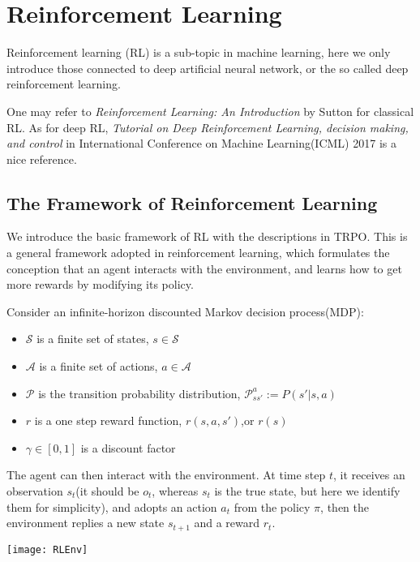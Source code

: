 \chapter{Reinforcement Learning}

Reinforcement learning (RL) is a sub-topic in machine learning, here we only introduce those connected to deep artificial neural network, or the so called deep reinforcement learning.

One may refer to \emph{Reinforcement Learning: An Introduction} by Sutton for classical RL. As for deep RL, \emph{Tutorial on Deep Reinforcement Learning, decision making, and control} in International Conference on Machine Learning(ICML) 2017 is a nice reference.

\section{The Framework of Reinforcement Learning}

We introduce the basic framework of RL with the descriptions in TRPO. This is a general framework adopted in reinforcement learning, which formulates the conception that an agent interacts with the environment, and learns how to get more rewards by modifying its policy.

Consider an infinite-horizon discounted Markov decision process(MDP): 
\begin{itemize}
    \item  $\mathcal{S}$ is a finite set of states, $s\in\mathcal{S}$
    \item $ \mathcal{A}$ is a finite set of actions, $a\in\mathcal{A}$
    \item $\mathcal{P}$ is the transition probability distribution, $\mathcal{P}_{ss'}^{a}:=P(s'|s,a)$
    \item $r$ is a one step reward function, $r(s,a,s')$,or $r(s)$ 
    \item $\gamma\in[0,1]$ is a discount factor
\end{itemize}

The agent can then interact with the environment. At time step $t$, it receives an observation $s_t$(it should be $o_t$, whereas $s_t$ is the true state, but here we identify them for simplicity), and adopts an action $a_t$ from the policy $\pi$, then the environment replies a new state $s_{t+1}$ and a reward $r_t$.

\begin{center}
\texttt{[image: RLEnv]}
\end{center}

